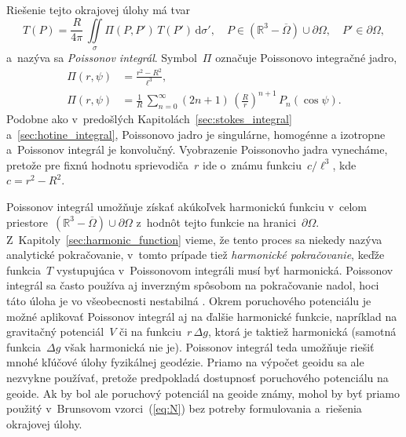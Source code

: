 \documentclass[a4paper, 12pt]{book}
\newcommand{\diff}{\mathrm d}
\begin{document}
Riešenie tejto okrajovej úlohy \parencite[pre odvodenie pozri 
napríklad][]{MoritzPhysicalGeodesy,SansoGeoidDetermination} má tvar
%
\begin{equation}
\label{eq:poisson}
T(P) = \frac{R}{4\pi} \, \iint\limits_\sigma \Pi(P, P') \, T(P') \, 
\diff\sigma'{,} \quad P \in \left( \mathbb{R}^3 - \overline\Omega \right) \cup 
\partial\Omega{,} \quad P' \in \partial\Omega{,}
\end{equation}
%
a~nazýva sa \emph{Poissonov integrál}.  Symbol~$\Pi$ označuje Poissonovo 
integračné jadro,
%
\begin{align}
\Pi(r, \psi) &= \frac{r^2 - R^2}{\ell^3}{,}\label{eq:poisson_kernel}\\
\Pi(r, \psi) &= \frac{1}{R} \, \sum_{n = 0}^{\infty} (2n + 1) \, \left( 
\frac{R}{r} \right)^{n + 1} \, 
P_n(\cos\psi)\label{eq:poisson_kernel_spectral}{.}
\end{align}
%
Podobne ako v~predošlých Kapitolách~\ref{sec:stokes_integral} 
a~\ref{sec:hotine_integral}, Poissonovo jadro je singulárne, homogénne 
a izotropne a~Poissonov integrál je konvolučný.  Vyobrazenie Poissonovho jadra 
vynecháme, pretože pre fixnú hodnotu sprievodiča~$r$ ide o~známu funkciu~$c 
\slash \ell^3$, kde $c = r^2 - R^2$.

Poissonov integrál umožňuje získať akúkoľvek harmonickú funkciu v~celom 
priestore~$\left( \mathbb{R}^3 - \overline\Omega \right) \cup \partial\Omega$ 
z~hodnôt tejto funkcie na hranici~$\partial\Omega$.  
Z~Kapitoly~\ref{sec:harmonic_function} vieme, že tento proces sa niekedy nazýva 
analytické pokračovanie, v~tomto prípade tiež \emph{harmonické pokračovanie}, 
keďže funkcia~$T$ vystupujúca v~Poissonovom integráli musí byť harmonická.  
Poissonov integrál sa často používa aj inverzným spôsobom na pokračovanie 
nadol, hoci táto úloha je vo všeobecnosti nestabilná 
\parencite{SansoGeodeticBoundaryValueProblem}.  Okrem poruchového potenciálu je 
možné aplikovať Poissonov integrál aj na ďalšie harmonické funkcie, napríklad 
na gravitačný potenciál~$V$ či na funkciu~$r \, \Delta g$, ktorá je taktiež 
harmonická (samotná funkcia~$\Delta g$ však harmonická nie je).  Poissonov 
integrál teda umožňuje riešiť mnohé kľúčové úlohy fyzikálnej geodézie.  Priamo 
na výpočet geoidu sa ale nezvykne používať, pretože predpokladá dostupnosť 
poruchového potenciálu na geoide.  Ak by bol ale poruchový potenciál na geoide 
známy, mohol by byť priamo použitý v~Brunsovom vzorci~(\ref{eq:N}) bez potreby 
formulovania a~riešenia okrajovej úlohy.
\end{document}
